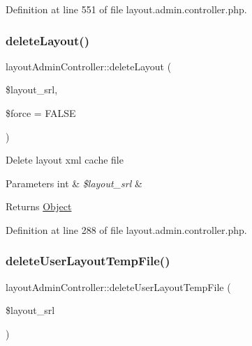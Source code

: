 Definition at line 551 of file layout.\+admin.\+controller.\+php.

\mbox{\label{classlayoutAdminController_a2e6e041059b08e3050ebf0f9fd0630bb}} 
\subsubsection{\texorpdfstring{delete\+Layout()}{deleteLayout()}}
{\footnotesize\ttfamily layout\+Admin\+Controller\+::delete\+Layout (\begin{DoxyParamCaption}\item[{}]{\$layout\+\_\+srl,  }\item[{}]{\$force = {\ttfamily FALSE} }\end{DoxyParamCaption})}

Delete layout xml cache file 
\begin{DoxyParams}[1]{Parameters}
int & {\em \$layout\+\_\+srl} & \\
\hline
\end{DoxyParams}
\begin{DoxyReturn}{Returns}
\hyperlink{classObject}{Object} 
\end{DoxyReturn}


Definition at line 288 of file layout.\+admin.\+controller.\+php.

\mbox{\label{classlayoutAdminController_a993e68df95066c306c09b550ac705b1e}} 
\subsubsection{\texorpdfstring{delete\+User\+Layout\+Temp\+File()}{deleteUserLayoutTempFile()}}
{\footnotesize\ttfamily layout\+Admin\+Controller\+::delete\+User\+Layout\+Temp\+File (\begin{DoxyParamCaption}\item[{}]{\$layout\+\_\+srl }\end{DoxyParamCaption})}

